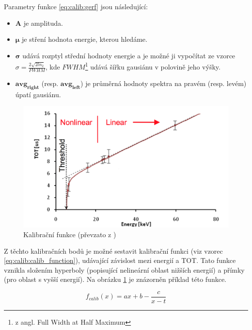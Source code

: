 Parametry funkce \ref{eq:calib:gerf} jsou následující:
\begin{itemize}
	\item $\mathbf{A}$ je amplituda.
	\item $\mathbf{\mu}$ je stření hodnota energie, kterou hledáme.
	\item $\mathbf{\sigma}$ udává rozptyl střední hodnoty energie a je možné ji vypočítat ze vzorce 
		$\sigma = \frac{2\sqrt{2ln_2}}{FWHM}$, kde $FWHM$\footnote{z angl. Full Width at Half Maximum} udává šířku gausiánu v polovině jeho výšky.
	\item $\mathbf{avg_{right}}$ (resp. $\mathbf{avg_{left}}$) je průměrná hodnoty spektra na pravém (resp. levém) úpatí gausiánu.
\end{itemize}
 
\begin{figure}[th]
	\begin{center}
		\includegraphics[width=13cm]{figures/calib_function.png}
		\caption{Kalibrační funkce (převzato z \cite{Jakubek2011S262})}
		\label{fig:calib:calib_function}
	\end{center}
\end{figure}

Z těchto kalibračních bodů je možné sestavit kalibrační funkci (viz vzorec \ref{eq:calib:calib_function}), udávající závislost mezi energií a TOT. Tato funkce vznikla složením hyperboly (popisující nelineární oblast nižších energií) a přímky (pro oblast s vyšší energií). Na obrázku \ref{fig:calib:calib_function} je znázorněn příklad této funkce.

\begin{equation}\label{eq:calib:calib_function}
	f_{calib}(x) = ax + b - \frac{c}{x-t}
\end{equation}


